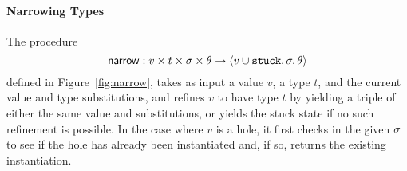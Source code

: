 \paragraph{Narrowing Types} The procedure %
$$
\mathsf{narrow} : v \times t \times \sigma \times \theta \rightarrow \langle v \cup \mathtt{stuck}, \sigma, \theta \rangle
$$
defined in Figure~\ref{fig:narrow}, takes as input a value $v$, a type
$t$, and the current value and type substitutions, and refines $v$ to
have type $t$ by yielding a triple of either the same value and
substitutions, or yields the stuck state if no such refinement is
possible. In the case where $v$ is a hole, it first checks in the given
$\sigma$ to see if the hole has already been instantiated and, if so,
returns the existing instantiation.
%
